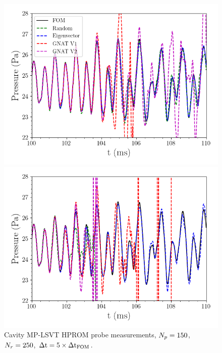 \begin{figure}
	\begin{minipage}{0.49\linewidth}
		\includegraphics[width=0.99\linewidth]{Chapters/HPROMResults/Images/cavity/deim/pressure_probe_deim_2p5.png}
	\end{minipage}
	\begin{minipage}{0.49\linewidth}
		\includegraphics[width=0.99\linewidth]{Chapters/HPROMResults/Images/cavity/deim/pressure_probe_deim_1.png}
	\end{minipage}
	\caption{\label{fig:cavitySampledROMProbes}Cavity MP-LSVT HPROM probe measurements, $N_p = 150$, $N_r = 250$, $\Delta \text{t} = 5 \times \Delta \text{t}_{\text{FOM}}$.}
\end{figure}

